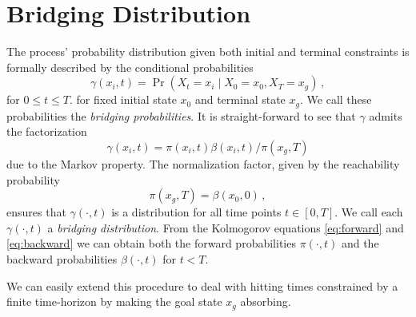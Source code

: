 \section{Bridging Distribution}\label{sec:bridge_dist}
The process' probability distribution given both initial and terminal
constraints is formally described  by
the conditional probabilities
\begin{equation}\label{eq:bridge_dist}
  \gamma(x_i, t) = \Pr(X_t = x_i \mid X_0 = x_0, X_T = x_g)\,,
\end{equation}
for $0\leq t\leq T$.
for fixed initial state $x_0$ and terminal state $x_g$.
We call these probabilities the \emph{bridging probabilities}.
It is straight-forward to see that      $\gamma$ admits the
factorization
\begin{equation}\label{eq:bridge_fact}
  \gamma(x_i, t) = \pi(x_i, t)\beta(x_i, t)/\pi(x_g, T)
\end{equation}
due to the Markov property.
The normalization factor, given by the reachability probability
\[
  \pi(x_g, T)=\beta(x_0, 0)\,,
\]
ensures that $\gamma(\cdot, t)$ is
a distribution for all time points $t\in[0,T]$.
We call each $\gamma(\cdot, t)$ a   \emph{bridging distribution}.
From the Kolmogorov equations \eqref{eq:forward}
and \eqref{eq:backward}
we can obtain both the forward probabilities $\pi(\cdot, t)$ and the
backward probabilities
$\beta(\cdot, t)$ for $t< T$.

We can easily extend this procedure to deal with hitting times
constrained by a finite time-horizon by making the goal state $x_g$ absorbing.

